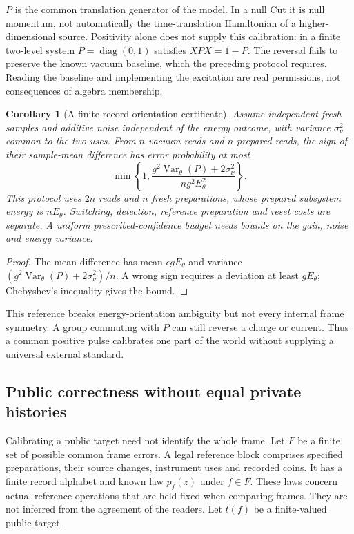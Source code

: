 \documentclass[12pt]{article}
\newtheorem{corollary}[theorem]{Corollary}
\theoremstyle{definition}
\theoremstyle{remark}
\begin{document}
$P$ is the common translation generator of the model. In a null Cut it is
null momentum, not automatically the time-translation Hamiltonian of a
higher-dimensional source. Positivity alone does not supply this calibration:
in a finite two-level system $P=\operatorname{diag}(0,1)$ satisfies $XPX=1-P$.
The reversal fails to preserve the known vacuum baseline, which the preceding
protocol requires. Reading the baseline and implementing the excitation are
real permissions, not consequences of algebra membership.

\begin{corollary}[A finite-record orientation certificate]
\label{cor:orientationcost}
Assume independent fresh samples and additive noise independent of the energy
outcome, with variance $\sigma_\nu^2$ common to the two uses. From $n$ vacuum
reads and $n$ prepared reads, the sign of their sample-mean difference has
error probability at most
\begin{equation}\label{eq:orientationcost}
 \min\left\{1,\frac{g^2\operatorname{Var}_\theta(P)+2\sigma_\nu^2}
 {n g^2E_\theta^2}\right\}.
\end{equation}
This protocol uses $2n$ reads and $n$ fresh preparations, whose prepared
subsystem energy is $nE_\theta$. Switching, detection, reference preparation
and reset costs are separate. A uniform prescribed-confidence budget needs
bounds on the gain, noise and energy variance.
\end{corollary}
\begin{proof}
The mean difference has mean $\epsilon gE_\theta$ and variance
$(g^2\operatorname{Var}_\theta(P)+2\sigma_\nu^2)/n$. A wrong sign requires a
deviation at least $gE_\theta$; Chebyshev's inequality gives the bound.
\end{proof}

This reference breaks energy-orientation ambiguity but not every internal
frame symmetry. A group commuting with $P$ can still reverse a charge or
current. Thus a common positive pulse calibrates one part of the world without
supplying a universal external standard.

\subsection{Public correctness without equal private histories}
\label{sec:publictarget}

Calibrating a public target need not identify the whole frame. Let
\(F\) be a finite set of possible common frame errors. A legal reference
block comprises specified preparations, their source changes, instrument
uses and recorded coins. It has a finite record alphabet and known law
\(p_f(z)\) under \(f\in F\). These laws concern actual reference operations
that are held fixed when comparing frames. They are not inferred from the
agreement of the readers. Let \(t(f)\) be a finite-valued public target.
\end{document}
